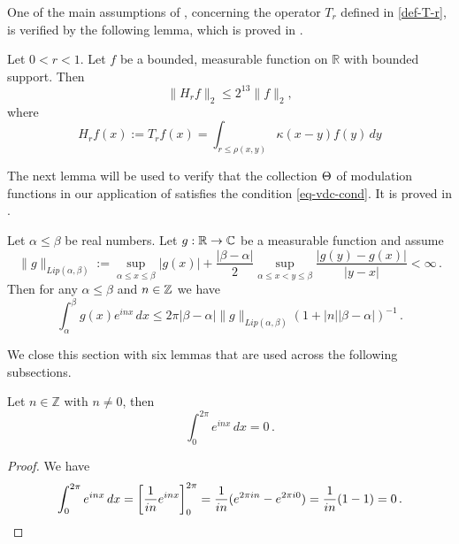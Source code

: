 One of the main assumptions of , concerning the operator $T_r$ defined in \eqref{def-T-r}, is verified by the following lemma, which is proved in .
\begin{lemma}
    \label{Hilbert-strong-2-2}
    \leanok
    Let $0<r<1$. Let $f$ be a bounded, measurable function on $\mathbb{R}$ with bounded support. Then
    \begin{equation}
        \label{eq-Hr-L2-bound}
        \|H_rf\|_{2}\leq 2^{13} \|f\|_2,
    \end{equation}
    where
    \begin{equation}
        \label{def-H-r}
        H_r f(x) := T_r f(x) = \int_{r\le\rho(x,y)} \kappa(x-y) f(y) \, dy
    \end{equation}
\end{lemma}

The next lemma will be used to verify that the collection ${\Theta}$ of modulation functions in our application of  satisfies the condition \eqref{eq-vdc-cond}.
It is proved in .

\begin{lemma}
\label{van-der-Corput}
\leanok
{}
    Let $\alpha\le\beta$ be real numbers. Let $g:{\mathbb{R}}\to {\mathbb{C}}$ be a measurable function and assume
    \begin{equation}
        \|g\|_{Lip(\alpha,\beta)}:=\sup_{\alpha\le x\le \beta}|g(x)|+\frac{|\beta-\alpha|}{2}
        \sup_{\alpha\le x<y\le \beta} \frac {|g(y)-g(x)|}{|y-x|}<\infty\, .
    \end{equation}
    Then for any $\alpha \le \beta$ and $n\in{\mathbb{Z}}$ we have
    \begin{equation}
        \int _{\alpha}^{\beta} g(x) e^{inx}\, dx\le 2\pi |\beta-\alpha|\|g\|_{Lip(\alpha,\beta)}(1+|n||\beta-\alpha|)^{-1}\, .
    \end{equation}

\end{lemma}


We close this section with six lemmas that are used
across the following subsections.

\begin{lemma}
\label{mean-zero-oscillation}
Let $n\in \mathbb{Z}$ with $n\neq 0$, then
\begin{equation}
\int_0^{2\pi} e^{inx}\, dx=0\,.
\end{equation}
\end{lemma}
\begin{proof}
We have
\begin{equation*}
\int_0^{2\pi} e^{inx}\, dx=\left[ \frac 1{in}e^{inx}\right]_0^{2\pi}=\frac 1{in}(e^{2\pi i n}-e^{2\pi i 0})=\frac 1{in}(1-1)=0\, . \qedhere
\end{equation*}

\end{proof}

